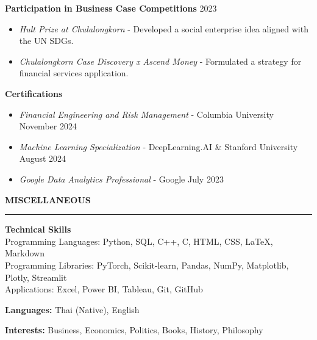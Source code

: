 \documentclass[11pt]{article}
\begin{document}
\textbf{Participation in Business Case Competitions} \hfill 2023
\begin{itemize}[noitemsep, topsep=0pt, partopsep=0pt, parsep=0pt]
    \item \textit{Hult Prize at Chulalongkorn} - Developed a social enterprise idea aligned with the UN SDGs.
    \item \textit{Chulalongkorn Case Discovery x Ascend Money} - Formulated a strategy for financial services application.
\end{itemize}

\vspace{3pt}

\textbf{Certifications}
\begin{itemize}[noitemsep, topsep=0pt, partopsep=0pt, parsep=0pt]
    \item \textit{Financial Engineering and Risk Management} - Columbia University \hfill November 2024
    \item \textit{Machine Learning Specialization} - DeepLearning.AI \& Stanford University \hfill August 2024
    \item \textit{Google Data Analytics Professional} - Google \hfill July 2023
\end{itemize}





\vspace{6pt}
\textbf{MISCELLANEOUS}
\vspace{5pt}
{\color{NavyBlue}\hrule}
\vspace{6pt}

\textbf{Technical Skills}\\
\hspace*{7pt} Programming Languages: Python, SQL, C++, C, HTML, CSS, LaTeX, Markdown\\
\hspace*{7pt} Programming Libraries: PyTorch, Scikit-learn, Pandas, NumPy, Matplotlib, Plotly, Streamlit\\
\hspace*{7pt} Applications: Excel, Power BI, Tableau, Git, GitHub

\textbf{Languages:} Thai (Native), English

\textbf{Interests:} Business, Economics, Politics, Books, History, Philosophy
\end{document}
